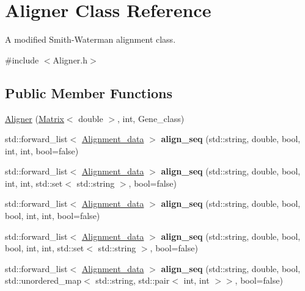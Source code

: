 \hypertarget{classAligner}{}\section{Aligner Class Reference}
\label{classAligner}


A modified Smith-\/\+Waterman alignment class.  




{\ttfamily \#include $<$Aligner.\+h$>$}

\subsection*{Public Member Functions}
\begin{DoxyCompactItemize}
\item 
\hyperlink{classAligner_ae8140f4445276cb5160fffe70c86c8d9}{Aligner} (\hyperlink{structMatrix}{Matrix}$<$ double $>$, int, Gene\+\_\+class)
\item 
\mbox{\label{classAligner_a3c12f68dc3ea2c4de4732af1f429c171}} 
std\+::forward\+\_\+list$<$ \hyperlink{structAlignment__data}{Alignment\+\_\+data} $>$ {\bfseries align\+\_\+seq} (std\+::string, double, bool, int, int, bool=false)
\item 
\mbox{\label{classAligner_a16705a7607d30d6e92452bb0aca10bc7}} 
std\+::forward\+\_\+list$<$ \hyperlink{structAlignment__data}{Alignment\+\_\+data} $>$ {\bfseries align\+\_\+seq} (std\+::string, double, bool, int, int, std\+::set$<$ std\+::string $>$, bool=false)
\item 
\mbox{\label{classAligner_adaec3732ded8532baed211b792c349b7}} 
std\+::forward\+\_\+list$<$ \hyperlink{structAlignment__data}{Alignment\+\_\+data} $>$ {\bfseries align\+\_\+seq} (std\+::string, double, bool, bool, int, int, bool=false)
\item 
\mbox{\label{classAligner_aa6423d11b9e978c7e0e93f22653678f4}} 
std\+::forward\+\_\+list$<$ \hyperlink{structAlignment__data}{Alignment\+\_\+data} $>$ {\bfseries align\+\_\+seq} (std\+::string, double, bool, bool, int, int, std\+::set$<$ std\+::string $>$, bool=false)
\item 
\mbox{\label{classAligner_a136197d2437d17676d489f2aa7bcbb42}} 
std\+::forward\+\_\+list$<$ \hyperlink{structAlignment__data}{Alignment\+\_\+data} $>$ {\bfseries align\+\_\+seq} (std\+::string, double, bool, std\+::unordered\+\_\+map$<$ std\+::string, std\+::pair$<$ int, int $>$$>$, bool=false)
$$
\end{DoxyCompactItemize}
